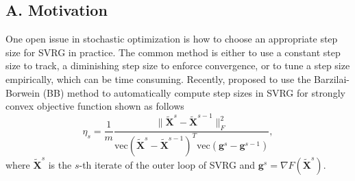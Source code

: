 \documentclass[letterpaper]{article} %
\begin{document}

\subsection{A. Motivation}

One open issue in stochastic optimization is how to choose an appropriate step size for SVRG in practice. The common method is either to use a constant step size to track, a diminishing step size to enforce convergence, or to tune a step size empirically, which can be time consuming. Recently, \cite{NIPS2016_6286} proposed to use the Barzilai-Borwein (BB) method to automatically compute step sizes in SVRG for strongly convex objective function shown as follows
\begin{equation}
	\label{eq:bb_step}
	\eta_{s} = \frac{1}{m}\frac{\|\tilde{\mathbf{X}}^{s}-\tilde{\mathbf{X}}^{s-1}\|^2_F}{\text{vec}(\tilde{\mathbf{X}}^{s}-\tilde{\mathbf{X}}^{s-1})^T\text{vec}(\mathbf{g}^s-\mathbf{g}^{s-1})},
\end{equation}
where $\tilde{\mathbf{X}}^{s}$ is the $s$-th iterate of the outer loop of SVRG and $\mathbf{g}^{s} = \nabla F(\tilde{\mathbf{X}}^s)$.
\end{document}
